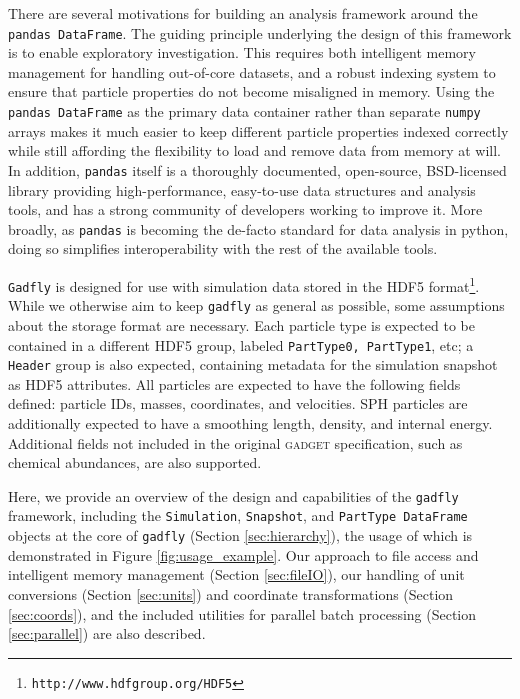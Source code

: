 \documentclass{emulateapj}
\newcommand{\code}[1]{\texttt{#1}}
\begin{document}
There are several motivations for building an analysis framework around the \code{pandas DataFrame}. 
The guiding principle underlying the design of this framework is to enable exploratory investigation.
This requires both intelligent memory management for handling out-of-core datasets, and a robust indexing system to ensure that particle properties do not become misaligned in memory.
Using  the \code{pandas DataFrame} as the primary data container rather than separate \code{numpy} arrays makes it much easier to keep different particle properties indexed correctly while still affording the flexibility to load and remove data from memory at will.
In addition, \code{pandas} itself is a thoroughly documented, open-source, BSD-licensed library providing high-performance, easy-to-use data structures and analysis tools, and has a strong community of developers working to improve it.  
More broadly, as \code{pandas} is becoming the de-facto standard for data analysis in python, doing so simplifies interoperability with the rest of the available tools.

\code{Gadfly} is designed for use with simulation data stored in the HDF5 format\footnote{\code{http://www.hdfgroup.org/HDF5}}.
While we otherwise aim to keep \code{gadfly} as general as possible, some assumptions about the storage format are necessary.
Each particle type is expected to be contained in a different HDF5 group, labeled \code{PartType0, PartType1}, etc; a \code{Header} group is also expected, containing metadata for the simulation snapshot as HDF5 attributes. 
All particles are expected to have the following fields defined: particle IDs, masses, coordinates, and velocities.  
SPH particles are additionally expected to have a smoothing length, density, and internal energy.  Additional fields not included in the original \textsc{gadget} specification, such as chemical abundances, are also supported.

Here, we provide an overview of the design and capabilities of the \code{gadfly} framework, including the \code{Simulation}, \code{Snapshot}, and \code{PartType DataFrame} objects at the core of \code{gadfly} (Section \ref{sec:hierarchy}), the usage of which is demonstrated in Figure \ref{fig:usage_example}.
Our approach to file access and intelligent memory management (Section \ref{sec:fileIO}), our handling of unit conversions (Section \ref{sec:units}) and coordinate transformations (Section \ref{sec:coords}), and the included utilities for parallel batch processing (Section \ref{sec:parallel}) are also described.
\end{document}
